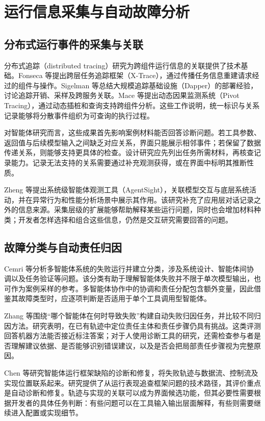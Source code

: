 \section{运行信息采集与自动故障分析}

\subsection{分布式运行事件的采集与关联}

分布式追踪（distributed tracing）研究为跨组件运行信息的关联提供了技术基础。Fonseca 等\cite{ref30}提出跨层任务追踪框架（X-Trace），通过传播任务信息重建请求经过的组件与操作。Sigelman 等\cite{ref32}总结大规模追踪基础设施（Dapper）的部署经验，讨论追踪开销、采样及跨服务关联。Mace 等\cite{ref31}提出动态因果监测系统（Pivot Tracing），通过动态插桩和查询支持跨组件分析。这些工作说明，统一标识与关系记录能够将分散事件组织为可查询的执行过程。

对智能体研究而言，这些成果首先影响案例材料能否回答诊断问题。若工具参数、返回值与后续模型输入之间缺乏对应关系，界面只能展示相邻事件；若保留了数据传递关系，则能够支持更具体的检查。设计研究应先列出任务所需材料，再核查记录能力。记录无法支持的关系需要通过补充观测获得，或在界面中标明其推断性质。

Zheng 等\cite{ref19}提出系统级智能体观测工具（AgentSight），关联模型交互与底层系统活动，并在异常行为和性能分析场景中展示其作用。该研究补充了应用层对话记录之外的信息来源。采集层级的扩展能够帮助解释某些运行问题，同时也会增加材料种类；开发者怎样选择和组合这些信息，仍然是交互研究需要回答的问题。

\subsection{故障分类与自动责任归因}

Cemri 等\cite{cemri2025mast}分析多智能体系统的失败运行并建立分类，涉及系统设计、智能体间协调以及任务验证等问题。该分类有助于理解智能体失败并不限于单次模型输出，也可作为案例采样的参考。多智能体协作中的协调和责任分配包含额外变量，因此借鉴其故障类型时，应逐项判断是否适用于单个工具调用型智能体。

Zhang 等\cite{ref03}围绕“哪个智能体在何时导致失败”构建自动失败归因任务，并比较不同归因方法。研究表明，在已有轨迹中定位责任主体和责任步骤仍具有挑战。这类评测回答机器方法能否接近标注答案；对于人使用诊断工具的研究，还需检查参与者是否理解建议依据、是否能够识别错误建议，以及是否会把局部责任步骤视为完整原因。

Chen 等\cite{ref20}研究智能体运行框架缺陷的诊断和修复，将失败轨迹与数据流、控制流及实现位置联系起来。研究提供了从运行表现追查框架问题的技术路径，其评价重点是自动诊断和修复。轨迹与实现的关联可以成为界面候选功能，但其必要性需要根据开发者的具体任务判断：有些问题可以在工具输入输出层面解释，有些则需要继续进入配置或实现细节。

